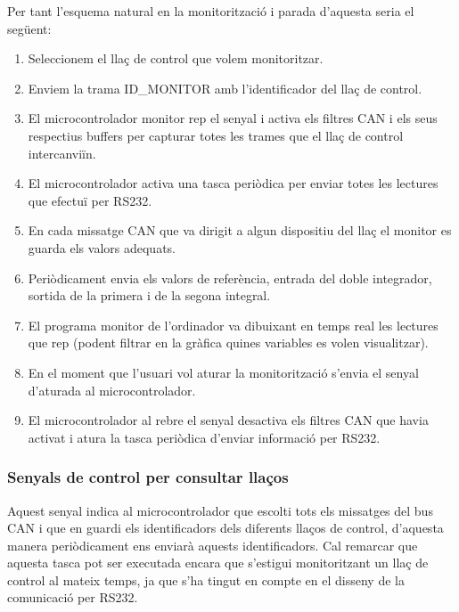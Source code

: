 Per tant l'esquema natural en la monitorització i parada d'aquesta seria el següent:

\begin{enumerate}
	\item Seleccionem el llaç de control que volem monitoritzar.
	\item Enviem la trama ID\_MONITOR amb l'identificador del llaç de control.
	\item El microcontrolador monitor rep el senyal i activa els filtres CAN i els seus respectius buffers per capturar totes les trames que el llaç de control intercanviïn.
	\item El microcontrolador activa una tasca periòdica per enviar totes les lectures que efectuï per RS232.
	\item En cada missatge CAN que va dirigit a algun dispositiu del llaç el monitor es guarda els valors adequats.
	\item Periòdicament envia els valors de referència, entrada del doble integrador, sortida de la primera i de la segona integral.
	\item El programa monitor de l'ordinador va dibuixant en temps real les lectures que rep (podent filtrar en la gràfica quines variables es volen visualitzar).
	\item En el moment que l'usuari vol aturar la monitorització s'envia el senyal d'aturada al microcontrolador.
	\item El microcontrolador al rebre el senyal desactiva els filtres CAN que havia activat i atura la tasca periòdica d'enviar informació per RS232.
\end{enumerate}


\subsubsection{Senyals de control per consultar llaços}\label{cap:dis:comSer:devices}

Aquest senyal indica al microcontrolador que escolti tots els missatges del bus CAN i que en guardi els identificadors dels diferents llaços de control, d'aquesta manera periòdicament ens enviarà aquests identificadors. Cal remarcar que aquesta tasca pot ser executada encara que s'estigui monitoritzant un llaç de control al mateix temps, ja que s'ha tingut en compte en el disseny de la comunicació per RS232.

